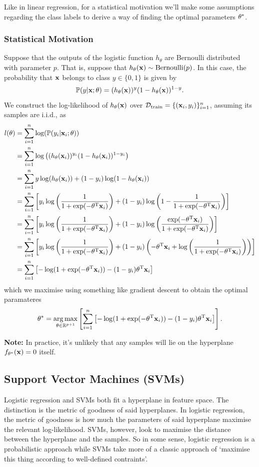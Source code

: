 \documentclass[11pt]{article}
\begin{document}
\noindent Like in linear regression, for a statistical motivation we'll make some assumptions regarding the class labels to derive a way of finding the optimal parameters $\theta^{*}$.

\subsubsection{Statistical Motivation}
Suppose that the outputs of the logistic function $h_{\theta}$ are Bernoulli distributed with parameter $p$. That is, suppose that $h_{\theta}(\mathbf{x})\sim\text{Bernoulli}(p)$. In this case, the probability that $\mathbf{x}$ belongs to class $y\in\{0, 1\}$ is given by
$$
\mathbb{P}(y|\mathbf{x};\theta)=(h_{\theta}(\mathbf{x}))^{y}(1-h_{\theta}(\mathbf{x}))^{1-y}.
$$
We construct the log-likelihood of $h_{\theta}(\mathbf{x})$ over $\mathcal{D}_{\text{train}}=\{(\mathbf{x}_i,y_i)\}_{i=1}^n$, assuming its samples are i.i.d., as
\begin{align*}
    l(\theta)
    &=
    \sum_{i=1}^n\log(\mathbb{P}(y_i|\mathbf{x}_i;\theta))\\
    &=
    \sum_{i=1}^n\log\left((h_{\theta}(\mathbf{x}_i))^{y_i}(1-h_{\theta}(\mathbf{x}_i))^{1-y_i}\right)\\
    &=
    \sum_{i=1}^ny\log(h_{\theta}(\mathbf{x}_i))+(1-y_i)\log(1-h_{\theta}(\mathbf{x}_i))\\
    &=
    \sum_{i=1}^n\left[y_i\log\left(\frac{1}{1+\exp(-\theta^{\text{T}}\mathbf{x}_i)}\right)+(1-y_i)\log\left(1-\frac{1}{1+\exp(-\theta^{\text{T}}\mathbf{x}_i)}\right)\right]\\
    &=
    \sum_{i=1}^n\left[y_i\log\left(\frac{1}{1+\exp(-\theta^{\text{T}}\mathbf{x}_i)}\right)+(1-y_i)\log\left(\frac{\exp(-\theta^{\text{T}}\mathbf{x}_i)}{1+\exp(-\theta^{\text{T}}\mathbf{x}_i)}\right)\right]\\
    &=
    \sum_{i=1}^n\left[y_i\log\left(\frac{1}{1+\exp(-\theta^{\text{T}}\mathbf{x}_i)}\right)+(1-y_i)\left(-\theta^{\text{T}}\mathbf{x}_i+\log\left(\frac{1}{1+\exp(-\theta^{\text{T}}\mathbf{x}_i)}\right)\right)\right]\\
    &=
    \sum_{i=1}^n\left[-\log(1+\exp(-\theta^{\text{T}}\mathbf{x}_i))-(1-y_i)\theta^{\text{T}}\mathbf{x}_i\right]
\end{align*}
which we maximise using something like gradient descent to obtain the optimal paramateres
$$
\theta^{*}
=
\operatorname*{arg\,max}_{\theta\in\mathbb{R}^{p+1}}\left[\sum_{i=1}^n\left[-\log(1+\exp(-\theta^{\text{T}}\mathbf{x}_i))-(1-y_i)\theta^{\text{T}}\mathbf{x}_i\right]\right].
$$

\noindent\textbf{Note:} In practice, it's unlikely that any samples will lie on the hyperplane $f_{\theta^*}(\mathbf{x})=0$ itself.

\subsection{Support Vector Machines (SVMs)}
Logistic regression and SVMs both fit a hyperplane in feature space. The distinction is the metric of goodness of said hyperplanes. In logistic regression, the metric of goodness is how much the parameters of said hyperplane maximise the relevant log-likelihood. SVMs, however, look to maximise the distance between the hyperplane and the samples. So in some sense, logistic regression is a probabilistic approach while SVMs take more of a classic approach of `maximise this thing according to well-defined contraints'.
\end{document}
